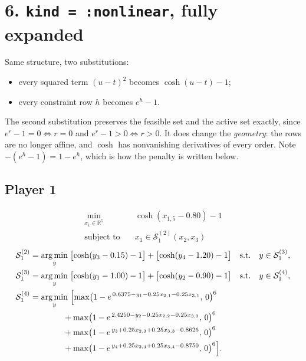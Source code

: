 \documentclass[11pt]{article}
\newcommand{\argmin}{\operatorname*{arg\,min}}
\begin{document}
\section*{6. \texttt{kind = :nonlinear}, fully expanded}

Same structure, two substitutions:
\begin{itemize}
  \item every squared term \((u-t)^2\) becomes \(\cosh(u-t)-1\);
  \item every constraint row \(h\) becomes \(e^{h}-1\).
\end{itemize}
The second substitution preserves the feasible set and the active set exactly, since
\(e^{r}-1 = 0 \iff r = 0\) and \(e^{r}-1 > 0 \iff r > 0\). It does change the \emph{geometry}:
the rows are no longer affine, and \(\cosh\) has nonvanishing derivatives of every order. Note
\(-(e^{h}-1) = 1-e^{h}\), which is how the penalty is written below.

\subsection*{Player 1}
\[
\begin{aligned}
  \min_{x_1 \in \mathbb{R}^5} \quad & \cosh(x_{1,5}-0.80)-1 \\
  \text{subject to} \quad & x_1 \in \mathcal{S}_1^{(2)}(x_2,x_3)
\end{aligned}
\]
\[
\begin{aligned}
  \mathcal{S}_1^{(2)} &= \argmin_{y} \;
    \bigl[\cosh(y_3-0.15)-1\bigr] + \bigl[\cosh(y_4-1.20)-1\bigr]
    \quad \text{s.t.} \quad y \in \mathcal{S}_1^{(3)}, \\
  \mathcal{S}_1^{(3)} &= \argmin_{y} \;
    \bigl[\cosh(y_1-1.00)-1\bigr] + \bigl[\cosh(y_2-0.90)-1\bigr]
    \quad \text{s.t.} \quad y \in \mathcal{S}_1^{(4)}, \\
  \mathcal{S}_1^{(4)} &= \argmin_{y} \;
    \Bigl[ \max\bigl(1 - e^{\,0.6375 - y_1 - 0.25x_{2,1} - 0.25x_{3,1}},\,0\bigr)^6 \\
    &\qquad\qquad + \max\bigl(1 - e^{\,2.4250 - y_2 - 0.25x_{2,2} - 0.25x_{3,2}},\,0\bigr)^6 \\
    &\qquad\qquad + \max\bigl(1 - e^{\,y_3 + 0.25x_{2,3} + 0.25x_{3,3} - 0.8625},\,0\bigr)^6 \\
    &\qquad\qquad + \max\bigl(1 - e^{\,y_4 + 0.25x_{2,4} + 0.25x_{3,4} - 0.8750},\,0\bigr)^6 \Bigr].
\end{aligned}
\]
\end{document}
